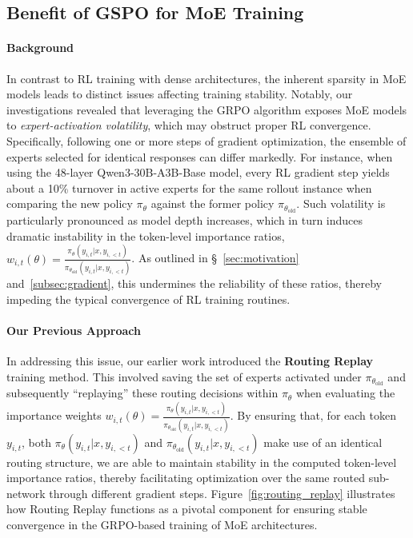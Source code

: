 \subsection{Benefit of GSPO for MoE Training}
\label{subsec:routing_replay}

\paragraph{Background}
In contrast to RL training with dense architectures, the inherent sparsity in MoE models leads to distinct issues affecting training stability. Notably, our investigations revealed that leveraging the GRPO algorithm exposes MoE models to \textit{expert-activation volatility}, which may obstruct proper RL convergence. Specifically, following one or more steps of gradient optimization, the ensemble of experts selected for identical responses can differ markedly. For instance, when using the 48-layer Qwen3-30B-A3B-Base model, every RL gradient step yields about a 10\% turnover in active experts for the same rollout instance when comparing the new policy $\pi_{\theta}$ against the former policy $\pi_{\theta_\text{old}}$.
Such volatility is particularly pronounced as model depth increases, which in turn induces dramatic instability in the token-level importance ratios, $w_{i,t}(\theta) = \frac{ \pi_{\theta} (y_{i,t} | x, y_{i,<t}) }{ \pi_{\theta_\text{old}} (y_{i,t} | x,y_{i,<t})}$. As outlined in \S~\ref{sec:motivation} and~\ref{subsec:gradient}, this undermines the reliability of these ratios, thereby impeding the typical convergence of RL training routines.

\paragraph{Our Previous Approach} In addressing this issue, our earlier work introduced the \textbf{Routing Replay} training method. This involved saving the set of experts activated under $\pi_{\theta_\text{old}}$ and subsequently “replaying” these routing decisions within $\pi_{\theta}$ when evaluating the importance weights $w_{i,t}(\theta) = \frac{ \pi_{\theta} (y_{i,t} | x, y_{i,<t}) }{ \pi_{\theta_\text{old}} (y_{i,t} | x,y_{i,<t})}$. By ensuring that, for each token $y_{i,t}$, both $\pi_{\theta} (y_{i,t} | x, y_{i,<t})$ and $\pi_{\theta_\text{old}} (y_{i,t} | x,y_{i,<t})$ make use of an identical routing structure, we are able to maintain stability in the computed token-level importance ratios, thereby facilitating optimization over the same routed sub-network through different gradient steps. Figure~\ref{fig:routing_replay} illustrates how Routing Replay functions as a pivotal component for ensuring stable convergence in the GRPO-based training of MoE architectures.

